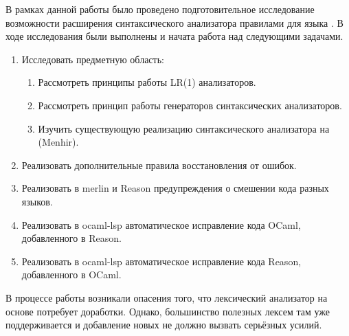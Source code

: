В рамках данной работы было проведено подготовительное исследование возможности расширения синтаксического анализатора \ReasonML{} правилами для языка \OCaml{}. В ходе исследования были выполнены и начата работа над следующими задачами.


\begin{enumerate}
\item[\checkmark] Исследовать предметную область:
\begin{enumerate} 
\item[\checkmark] Рассмотреть принципы работы LR(1) анализаторов.
\item[\checkmark] Рассмотреть принцип работы генераторов синтаксических анализаторов.
\item[\checkmark] Изучить существующую реализацию синтаксического анализатора на \OCaml{} (Menhir).
\end{enumerate}
\item[\checkmark] Реализовать дополнительные правила восстановления от ошибок.
\item[\checkmark] Реализовать в merlin и Reason предупреждения о смешении кода разных языков.
\item[\checkmark] Реализовать в ocaml-lsp автоматическое исправление кода OCaml, добавленного в Reason.
\item[\checkmark] Реализовать в ocaml-lsp автоматическое исправление кода Reason, добавленного в OCaml.
\end{enumerate}

\noindent В процессе работы возникали опасения того, что лексический анализатор \ReasonML{} на основе \ocamllex{} потребует доработки. Однако, большинство полезных лексем там уже поддерживается и добавление новых не должно вызвать серьёзных усилий. 


